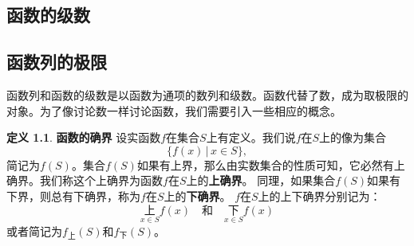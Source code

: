 \documentclass[12pt,UTF8]{ctexbook}
\theoremstyle{definition}
\newtheorem{df}{定义}[section]
\theoremstyle{plain}
\newtheorem{sk}{思考}[section]
\newtheorem{xt}{习题}[section]
\begin{document}



\begin{appendix}

\chapter{函数的级数}

\section{函数列的极限}

函数列和函数的级数是以函数为通项的数列和级数。函数代替了数，成为取极限的对象。为了像讨论数一样讨论函数，我们需要引入一些相应的概念。

\begin{df}{\textbf{函数的确界}}
    设实函数$f$在集合$S$上有定义。我们说$f$在$S$上的像为集合
    $$ \{f(x) \,|\, x\in S\}, $$
    简记为$f(S)$。集合$f(S)$如果有上界，那么由实数集合的性质可知，它必然有上确界。我们称这个上确界为函数$f$在$S$上的\textbf{上确界}。
    同理，如果集合$f(S)$如果有下界，则总有下确界，称为$f$在$S$上的\textbf{下确界}。
    $f$在$S$上的上下确界分别记为：
    $$ \underset{x\in S}{\text{上}} f(x) \quad \mbox{和} \quad \underset{x\in S}{\text{下}} f(x)$$
    或者简记为$f_{\text{上}}(S)$和$f_{\text{下}}(S)$。
\end{df}


\end{appendix}
\end{document}
